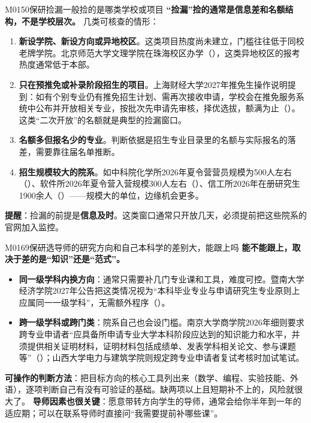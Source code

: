 \begin{qa}{M0150}{保研捡漏一般捡的是哪类学校或项目}
\textbf{“捡漏”捡的通常是信息差和名额结构，不是学校层次。} 几类可核查的情形：
\begin{enumerate}
  \item \textbf{新设学院、新设方向或异地校区}。这类项目热度尚未建立，门槛往往低于同校老牌学院。北京师范大学文理学院在珠海校区办学（），这类异地校区的报考热度通常低于本部。
  \item \textbf{只在预推免或补录阶段招生的项目}。上海财经大学2027年推免生操作说明提到：如有个别专业仍有推免招生计划、需再次接收申请，学校会在推免服务系统中公布并开放相关专业，按批次先申请先审核，择优选拔，额满为止（）。这类“二次开放”的名额就是典型的捡漏窗口。
  \item \textbf{名额多但报名少的专业}。判断依据是招生专业目录里的名额与实际报名的落差，需要靠往届名单推断。
  \item \textbf{招生规模较大的院系}。如中科院化学所2026年夏令营营员规模为500人左右（）、软件所2026年夏令营入营规模300人左右（）、信工所2026年在册研究生1900余人（）——规模大的单位，边缘机会更多。
\end{enumerate}
\textbf{提醒}：捡漏的前提是\textbf{信息及时}。这类窗口通常只开放几天，必须提前把这些院系的官网加入监控。
\end{qa}

\begin{qa}{M0169}{保研选导师的研究方向和自己本科学的差别大，能跟上吗}
\textbf{能不能跟上，取决于差的是“知识”还是“范式”。}
\begin{itemize}
  \item \textbf{同一级学科内换方向}：通常只需要补几门专业课和工具，难度可控。暨南大学经济学院2027年公告把这类情况视为“本科毕业专业与申请研究生专业原则上应属同一一级学科”，无需额外程序（）。
  \item \textbf{跨一级学科或跨门类}：院系自己也会设门槛。南京大学商学院2026年细则要求跨专业申请者“应具备所申请专业大学本科阶段应达到的知识能力和水平，并须提供相关证明材料，证明材料包括成绩单、发表学科相关论文、参与课题等”（）；山西大学电力与建筑学院则规定跨专业申请者复试考核时加试笔试。
\end{itemize}
\textbf{可操作的判断方法}：把目标方向的核心工具列出来（数学、编程、实验技能、外语），逐项判断自己有没有可验证的基础。缺两项以上且短期补不上的，风险就很大了。
\textbf{导师因素也很关键}：愿意带转方向学生的导师，通常会给你半年到一年的适应期；可以在联系导师时直接问“我需要提前补哪些课”。
\end{qa}

